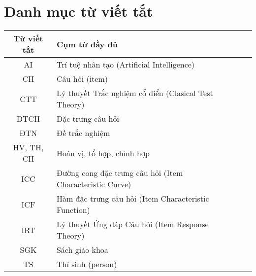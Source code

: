 \chapter*{Danh mục từ viết tắt}
\begin{longtable}{SlSl}
	\textbf{Từ viết tắt} & \textbf{Cụm từ đầy đủ}\\ \hline
	AI & Trí tuệ nhân tạo (Artificial Intelligence)\\
	CH & Câu hỏi (item)\\
	CTT & Lý thuyết Trắc nghiệm cổ điển (Clasical Test Theory)\\
	ĐTCH & Đặc trưng câu hỏi\\
	ĐTN & Đề trắc nghiệm\\
	HV, TH, CH & Hoán vị, tổ hợp, chỉnh hợp\\
	ICC & Đường cong đặc trưng câu hỏi (Item Characteristic Curve)\\
	ICF & Hàm đặc trưng câu hỏi (Item Characteristic Function)\\
	IRT & Lý thuyết Ứng đáp Câu hỏi (Item Response Theory)\\
	SGK & Sách giáo khoa\\
	TS & Thí sinh (person)\\
\end{longtable}
